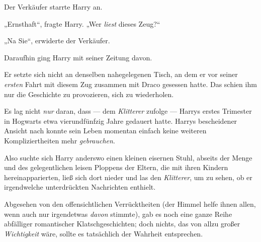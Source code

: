 Der Verkäufer starrte Harry an.

„Ernsthaft“, fragte Harry.
„Wer \emph{liest} dieses Zeug?“

„Na Sie“, erwiderte der Verkäufer.

Daraufhin ging Harry mit seiner Zeitung davon.

Er setzte sich nicht an denselben nahegelegenen Tisch, an dem er vor seiner \emph{ersten} Fahrt mit diesem Zug zusammen mit Draco gesessen hatte. Das schien ihm nur die Geschichte zu provozieren, sich zu wiederholen.

Es lag nicht \emph{nur} daran, dass — dem \emph{Klitterer} zufolge — Harrys erstes Trimester in Hogwarts etwa vierundfünfzig Jahre gedauert hatte. Harrys bescheidener Ansicht nach konnte sein Leben momentan einfach keine weiteren Kompliziertheiten mehr \emph{gebrauchen}.

Also suchte sich Harry anderswo einen kleinen eisernen Stuhl, abseits der Menge und des gelegentlichen leisen Ploppens der Eltern, die mit ihren Kindern hereinapparierten, ließ sich dort nieder und las den \emph{Klitterer}, um zu sehen, ob er irgendwelche unterdrückten Nachrichten enthielt.

Abgesehen von den offensichtlichen Verrücktheiten (der Himmel helfe ihnen allen, wenn auch nur irgendetwas \emph{davon} stimmte), gab es noch eine ganze Reihe abfälliger romantischer Klatschgeschichten; doch nichts, das von allzu großer \emph{Wichtigkeit} wäre, sollte es tatsächlich der Wahrheit entsprechen.

